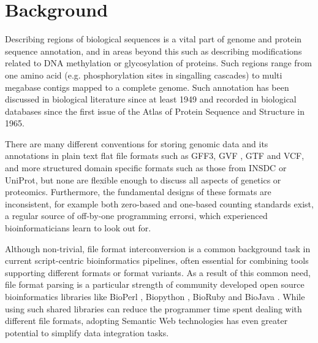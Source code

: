 \section*{Background}
Describing regions of biological sequences is a vital part of genome and protein sequence
annotation, and in areas beyond this such as describing modifications related to DNA methylation
or glycosylation of proteins.
Such regions range from one amino acid (e.g. phosphorylation sites in
singalling cascades) to multi megabase contigs mapped to a complete genome.
Such annotation has been discussed in biological literature since at least 1949\cite{Sanger1949} and recorded in biological databases since the first issue of the Atlas of Protein Sequence and Structure\cite{dayhoff1965atlas} in 1965.

There are many different conventions for storing genomic data and its
annotations in plain text flat file formats such as GFF3, GVF
\cite{GVF}, GTF and VCF, and more structured domain specific formats
such as those from INSDC or UniProt, but none are flexible enough to
discuss all aspects of genetics or proteomics.
Furthermore, the fundamental designs of these formats are
inconsistent, for example both zero-based and one-based counting
standards exist, a regular source of off-by-one programming errorsi,
which experienced bioinformaticians learn to look out for.

Although non-trivial, file format interconversion is a common background task
in current script-centric bioinformatics pipelines, often essential for combining
tools supporting different formats or format variants. 
As a result of this common need, file format parsing is a particular strength of
community developed open source bioinformatics libraries like BioPerl
\cite{BioPerl2002}, Biopython \cite{Biopython2009}, BioRuby \cite{BioRuby2010}
and BioJava \cite{BioJava2012}. While using such shared libraries can reduce the
programmer time spent dealing with different file formats, adopting Semantic
Web technologies has even greater potential to simplify data integration tasks.


